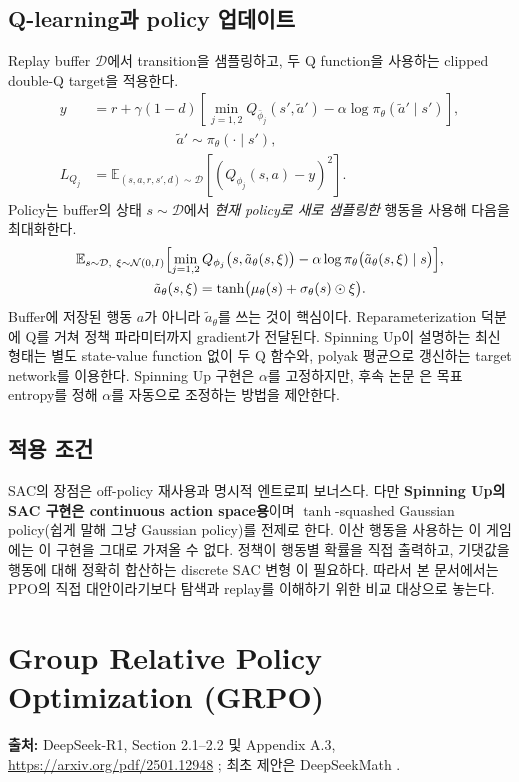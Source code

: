 \documentclass[11pt,a4paper]{article}
\newcommand{\E}{\mathbb{E}}
\begin{document}
\subsection{Q-learning과 policy 업데이트}
Replay buffer \(\mathcal D\)에서 transition을 샘플링하고, 두 Q function을 사용하는 clipped double-Q target을 적용한다.
\begin{align}
 y&=r+\gamma(1-d)\left[\min_{j=1,2}Q_{\bar\phi_j}(s',\tilde a')-\alpha\log\pi_\theta(\tilde a'\mid s')\right],\\
 &\hspace{6em}\tilde a'\sim\pi_\theta(\cdot\mid s'),\\
 L_{Q_j}&=\E_{(s,a,r,s',d)\sim\mathcal D}\left[(Q_{\phi_j}(s,a)-y)^2\right].
\end{align}
Policy는 buffer의 상태 \(s\sim\mathcal D\)에서 \emph{현재 policy로 새로 샘플링한} 행동을 사용해 다음을 최대화한다.
\begin{gather}
 \E_{s\sim\mathcal D,\ \xi\sim\mathcal N(0,I)}\Bigl[\min_{j=1,2}Q_{\phi_j}\bigl(s,\tilde a_\theta(s,\xi)\bigr)-\alpha\log\pi_\theta\bigl(\tilde a_\theta(s,\xi)\mid s\bigr)\Bigr],\\
 \tilde a_\theta(s,\xi)=\tanh\bigl(\mu_\theta(s)+\sigma_\theta(s)\odot\xi\bigr).
\end{gather}
Buffer에 저장된 행동 \(a\)가 아니라 \(\tilde a_\theta\)를 쓰는 것이 핵심이다. Reparameterization 덕분에 Q를 거쳐 정책 파라미터까지 gradient가 전달된다. Spinning Up이 설명하는 최신 형태는 별도 state-value function 없이 두 Q 함수와, polyak 평균으로 갱신하는 target network를 이용한다. Spinning Up 구현은 \(\alpha\)를 고정하지만, 후속 논문 \cite{sac-apps}은 목표 entropy를 정해 \(\alpha\)를 자동으로 조정하는 방법을 제안한다.

\subsection{적용 조건}
SAC의 장점은 off-policy 재사용과 명시적 엔트로피 보너스다. 다만 \textbf{Spinning Up의 SAC 구현은 continuous action space용}이며 \(\tanh\)-squashed Gaussian policy(쉽게 말해 그냥 Gaussian policy)를 전제로 한다. 이산 행동을 사용하는 이 게임에는 이 구현을 그대로 가져올 수 없다. 정책이 행동별 확률을 직접 출력하고, 기댓값을 행동에 대해 정확히 합산하는 discrete SAC 변형 \cite{sac-discrete}이 필요하다. 따라서 본 문서에서는 PPO의 직접 대안이라기보다 탐색과 replay를 이해하기 위한 비교 대상으로 놓는다.

\section{Group Relative Policy Optimization (GRPO)}\label{sec:grpo}
\noindent\textbf{출처:} DeepSeek-R1, Section 2.1--2.2 및 Appendix A.3, \url{https://arxiv.org/pdf/2501.12948} \cite{deepseek-r1}; 최초 제안은 DeepSeekMath \cite{deepseekmath}.
\end{document}
